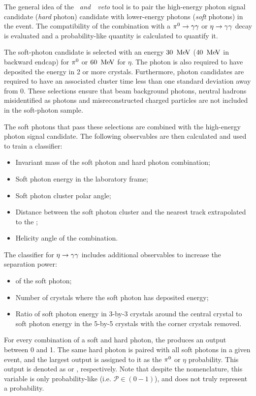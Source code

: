 The general idea of the \textit{\piz~and~\eta~veto} tool is to pair the high-energy photon signal candidate (\textit{hard} photon) candidate with lower-energy photons (\textit{soft} photons) in the event.
The compatibility of the combination with a $\pi^0\rightarrow\gamma\gamma$ or $\eta\rightarrow\gamma\gamma$ decay is evaluated and a probability-like quantity is calculated to quantify it.

The soft-photon candidate is selected with an energy $30~\mathrm{\,Me\kern -0.1em V}$ ($40~\mathrm{\,Me\kern -0.1em V}$ in backward \ECL endcap) for $\pi^0$ or $60~\mathrm{\,Me\kern -0.1em V}$ for $\eta$.
The photon is also required to have deposited the energy in 2 or more crystals.
Furthermore, photon candidates are required to have an associated cluster time less than one standard deviation away from 0.
These selections ensure that beam background photons, neutral hadrons misidentified as photons and misreconstructed charged particles are not included in the soft-photon sample.

The soft photons that pass these selections are combined with the high-energy photon signal candidate.
The following observables are then calculated and used to train a \MVA classifier:
\begin{itemize}
    \item Invariant mass of the soft photon and hard photon combination;
    \item Soft photon energy in the laboratory frame;
    \item Soft photon \ECL cluster polar angle;
    \item Distance between the soft photon \ECL cluster and the nearest track extrapolated to the \ECL;
    \item Helicity angle of the combination.
\end{itemize}
The classifier for $\eta\rightarrow\gamma\gamma$ includes additional observables to increase the separation power:
\begin{itemize}
    \item \ZMVA of the soft photon;
    \item Number of crystals where the soft photon has deposited energy;
    \item Ratio of soft photon energy in 3-by-3 crystals around the central crystal to soft photon energy in the 5-by-5 crystals with the corner crystals removed.
\end{itemize}
For every combination of a soft and hard photon, the \MVA produces an output between 0 and 1.
The same hard photon is paired with all soft photons in a given event, and the largest \MVA output is assigned to it as the $\pi^0$ or $\eta$ probability.
This \MVA output is denoted as \piVeto or \etaVeto, respectively.
Note that despite the nomenclature, this variable is only probability-like (i.e. $\mathcal{P}\in(0-1)$), and does not truly represent a probability.

